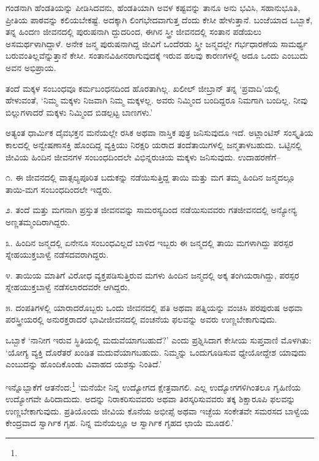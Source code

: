 ಗಂಡನಾಗಿ ಹೆಂಡತಿಯನ್ನು ಪೀಡಿಸಿದವನು, ಹೆಂಡತಿಯಾಗಿ ಅವಳ ಕಷ್ಟವನ್ನು ತಾನೂ ಅನು ಭವಿಸಿ, ಸಹಾನುಭೂತಿ, ಪ್ರೀತಿಯ ಪಾಠವನ್ನು ಕಲಿಯಬೇಕಷ್ಟೆ. ಅದಕ್ಕಾಗಿ ಲಿಂಗಭೇದವಾಗುತ್ತ ದೆಂದು ಕೇಸೀ ಹೇಳುತ್ತಾನೆ. ಬಂಜೆಯಾದ ಒಬ್ಬಾಕೆ, ತನ್ನ ಹಿಂದಣ ಜೀವನದಲ್ಲಿ ಪುರುಷನಾಗಿ ದ್ದುದರಿಂದ, ಈಗಿನ ಸ್ತ್ರೀ ಜೀವನದಲ್ಲಿ ಸಂತಾನ ಪಡೆಯಲು ಅಸಮರ್ಥಳಾಗಿದ್ದಾಳೆ. ಅನೇಕ ಜನ್ಮ ಪುರುಷನಾಗಿದ್ದ ಜೀವಿಗೆ ಒಂದೆರಡು ಸ್ತ್ರೀ ಜನ್ಮದಲ್ಲೇ ಗರ್ಭಧಾರಣೆಯ ಸಾಮರ್ಥ್ಯ ಬರುವಂತಿಲ್ಲವೆನ್ನುತ್ತಾನೆ ಕೇಸೀ. ಸಂತಾನವಿಹೀನರಾಗುವುದಕ್ಕೆ ಇರುವ ಹಲವು ಕಾರಣಗಳಲ್ಲಿ ಅದೂ ಒಂದು ಎಂಬುದು ಅವನ ಅಭಿಪ್ರಾಯ.

ತಂದೆ ಮಕ್ಕಳ ಸಂಬಂಧವೂ ಕರ್ಮಬಂಧನದಿಂದ ಹೊರತಾಗಿಲ್ಲ. ಖಲೀಲ್ ಜೀಬ್ರಾನ್ ತನ್ನ ‘ಪ್ರವಾದಿ’ಯಲ್ಲಿ ಹೇಳುವಂತೆ, ‘ನಿಮ್ಮ ಮಕ್ಕಳು ನಿಜವಾಗಿ ನಿಮ್ಮ ಮಕ್ಕಳಲ್ಲ. ಅವರು ನಿಮ್ಮಿಂದ ಬಂದಿದ್ದರೂ ನಿಮಗಾಗಿ ಬಂದಿಲ್ಲ. ನೀವು ಬಿಲ್ಲುಗಳಾದರೆ ಮಕ್ಕಳು ನಿಮ್ಮಿಂದ ಬಿಡಲ್ಪಟ್ಟ ಬಾಣಗಳು.’

ಅತ್ಯಂತ ಧಾರ್ಮಿಕ ದೈವಭಕ್ತನ ಮನೆಯಲ್ಲೇ ರಸಿಕ ಅಥವಾ ನಾಸ್ತಿಕ ಪುತ್ರ ಜನಿಸುವುದೂ ಇದೆ. ಅಟ್ಲಾಂಟಿಸ್ ಸಂಸ್ಕೃತಿಯ ಕಾಲದಲ್ಲಿ ಅನ್ವೇಷಣಾಸಕ್ತಿ ಹೊಂದಿದ್ದ ವ್ಯಕ್ತಿಯು ನಿರಕ್ಷರಿ ಯರಾದ ತಂದೆತಾಯಿಗಳಲ್ಲಿ ಜನ್ಮತಾಳಬಹುದು. ಒಟ್ಟಿನಲ್ಲಿ ಜೀವಿಯ ಹಿಂದಿನ ಜೀವನಗಳ ಸಂಬಂಧದಿಂದಲೇ ವಿಭಿನ್ನರುಚಿಯ ಮಕ್ಕಳು ಜನಿಸುವುದು. ಉದಾಹರಣೆಗೆ–

೧. ಈ ಜೀವನದಲ್ಲಿ ವಾತ್ಸಲ್ಯಪೂರಿತ ಬದುಕನ್ನು ನಡೆಯಿಸುತ್ತಿದ್ದ ತಾಯಿ ಮತ್ತು ಮಗ ತಮ್ಮ ಹಿಂದಿನ ಜನ್ಮದಲ್ಲೂ ತಾಯಿ-ಮಗ ಸಂಬಂಧದಿಂದಲೇ ಇದ್ದರು.

೨. ತಂದೆ ಮತ್ತು ಮಗನಾಗಿ ಪ್ರಸ್ತುತ ಜೀವನವನ್ನು ಸಾಮರಸ್ಯದಿಂದ ನಡೆಯಿಸುವವರು ಗತಜೀವನದಲ್ಲಿ ಅನ್ಯೋನ್ಯ ಅಣ್ಣತಮ್ಮಂದಿರಾಗಿದ್ದರು.

೩. ಹಿಂದಿನ ಜನ್ಮದಲ್ಲಿ ಏನೇನೂ ಸಂಬಂಧವಿಲ್ಲದೆ ಬಾಳಿದ ಇಬ್ಬರು ಈ ಜನ್ಮದಲ್ಲಿ ತಾಯಿ ಮಗಳಾಗಿದ್ದು ಪರಸ್ಪರ ಸ್ನೇಹಯುಕ್ತಬಾಳ್ವೆ ನಡೆಸದವರಾಗಿದ್ದರು.

೪. ತಾಯಿಯ ಮಾತಿಗೆ ವಿರೋಧ ವ್ಯಕ್ತಪಡಿಸುತ್ತಿರುವ ಮಗಳು ಹಿಂದಿನ ಜನ್ಮದಲ್ಲಿ ಅಕ್ಕ ತಂಗಿಯರಾಗಿದ್ದು, ಪರಸ್ಪರ ಸ್ನೇಹಯುಕ್ತಬಾಳ್ವೆ ನಡೆಸಲಾರದವರೇ ಆಗಿದ್ದರು.

೫. ದಂಪತಿಗಳಲ್ಲಿ ಯಾರಾದರೊಬ್ಬರು ಒಂದು ಜೀವನದಲ್ಲಿ ಪತಿ ಅಥವಾ ಪತ್ನಿಯನ್ನು ವಂಚಿಸಿ ಪರಪುರುಷ ಅಥವಾ ಪರಸ್ತ್ರೀಯರಲ್ಲಿ ಅನುರಕ್ತರಾದರೆ ಭಾವೀಜೀವನದಲ್ಲಿ ವಂಚನೆಯ ಫಲವನ್ನು ಅವರು ಉಣ್ಣಬೇಕಾಗುವುದು.

ಒಬ್ಬಾಕೆ ‘ನಾನೀಗ ಇರುವ ಸ್ಥಿತಿಯಲ್ಲಿ ಮದುವೆಯಾಗಬಹುದೆ?’ ಎಂದು ಪ್ರಶ್ನಿಸಿದಾಗ ಕೇಸೀಯ ಸುಪ್ತವಾಣಿ ಮೊಳಗಿತು: ‘ಯೋಗ್ಯ ವ್ಯಕ್ತಿ ದೊರೆತರೆ ಖಂಡಿತ ಮದುವೆಯಾಗಬಹುದು. ನಿಮ್ಮನ್ನು ಒಂದುಗೂಡಿಸುವ ಧ್ಯೇಯೋದ್ದೇಶ ಯಾವುದು ಎಂಬುದನ್ನು ಹೊಂದಿಕೊಂಡು ವಿವಾಹದ ಯಶಸ್ಸು ನಿಂತಿದೆ.’

ಇನ್ನೊಬ್ಬಾಕೆಗೆ ಆತನೆಂದ:\footnote{} ‘ಮನೆಯೇ ನಿನ್ನ ಉದ್ಯೋಗದ ಕ್ಷೇತ್ರವಾಗಲಿ. ಎಲ್ಲ ಉದ್ಯೋಗಗಳಿಗಿಂತಲೂ ಗೃಹಿಣಿಯ ಉದ್ಯೋಗವೇ ಹಿರಿದಾದುದು. ಅದನ್ನು ನಿರಾಕರಿಸುವವರು ಅಥವಾ ತಿರಸ್ಕರಿಸುವವರು ತಕ್ಕ ಶಿಕ್ಷಾರೂಪಿ ಫಲವನ್ನು ಉಣ್ಣಬೇಕಾಗುವುದು. ಪ್ರತಿಯೊಂದು ಜೀವಿಯ ಕೊನೆಯ ಅಭೀಪ್ಸೆ ಅಥವಾ ಇಚ್ಛೆಯ ಸಂಕೇತವೇ ಸಮರಸದ ಬಾಳ್ವೆಯ ಕೇಂದ್ರವಾದ ಸ್ವಾರ್ಗಿಕ ಗೃಹ. ನಿನ್ನ ಮನೆಯಲ್ಲೂ ಆ ಸ್ವಾರ್ಗಿಕ ಗೃಹದ ಛಾಯೆ ಮೂಡಲಿ.’


